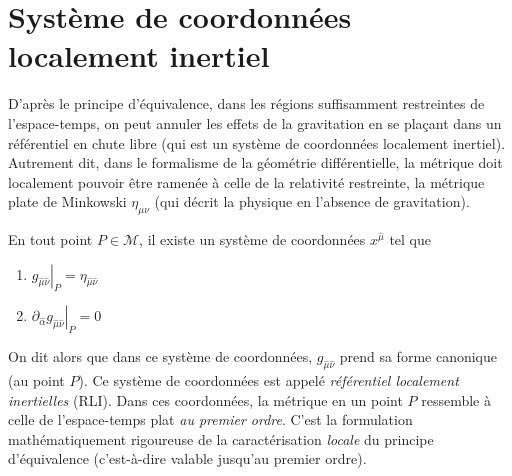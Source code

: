 \section{Système de coordonnées localement inertiel}
D'après le principe d'équivalence, dans les régions suffisamment restreintes de l'espace-temps, on peut annuler les effets de la gravitation en se plaçant dans un référentiel en chute libre (qui est un système de coordonnées localement inertiel). Autrement dit, dans le formalisme de la géométrie différentielle, la métrique doit localement pouvoir être ramenée à celle de la relativité restreinte, la métrique plate de Minkowski $\eta_{\mu\nu}$ (qui décrit la physique en l'absence de gravitation). 

\begin{theoremframe}
    \begin{propri}
        \label{prop: PE}
        En tout point $P \in \mathcal{M}$, il existe un système de coordonnées $x^{\hat{\mu}}$ tel que
       \begin{enumerate}[label = \roman*.]
           \item $\left. g_{\hat{\mu}\hat{\nu}} \right|_P = \eta_{\hat{\mu}\hat{\nu}}$
           \item $ \left. \partial_{\hat{\alpha}}g_{\hat{\mu}\hat{\nu}} \right|_P=0$
           \label{Propriété 4.1}
       \end{enumerate}
       \label{localement métrique de Minkowski}
    \end{propri}    
\end{theoremframe}
On dit alors que dans ce système de coordonnées, $g_{\hat{\mu}\hat{\nu}}$ prend sa forme canonique (au point $P$). Ce système de coordonnées est appelé \textit{référentiel localement inertielles} (RLI). Dans ces coordonnées, la métrique en un point $P$ ressemble à celle de l'espace-temps plat \emph{au premier ordre}. C'est la formulation mathématiquement rigoureuse de la caractérisation \emph{locale} du principe d'équivalence (c'est-à-dire valable jusqu'au premier ordre).

